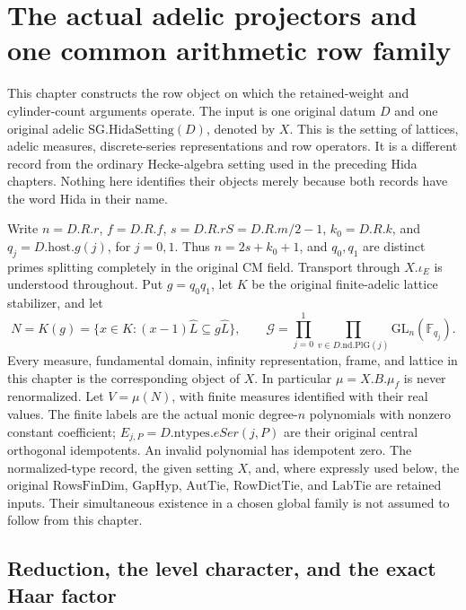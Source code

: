 \documentclass[11pt,a4paper]{article}
\numberwithin{equation}{section}
\theoremstyle{remark}\newtheorem{remark}[theorem]{Remark}
\begin{document}
\section{The actual adelic projectors and one common arithmetic row family}
\label{sec:arithmetic-rows-v46}

This chapter constructs the row object on which the retained-weight
and cylinder-count arguments operate.  The input is one original
datum \(D\) and one original adelic \(\mathrm{SG.HidaSetting}(D)\),
denoted by \(X\).  This is the setting of lattices, adelic measures,
discrete-series representations and row operators.  It is a different
record from the ordinary Hecke-algebra setting used in the preceding
Hida chapters.  Nothing here identifies their objects merely because
both records have the word Hida in their name.

Write \(n=D.R.r\), \(f=D.R.f\), \(s=D.R.rS=D.R.m/2-1\),
\(k_0=D.R.k\), and \(q_j=D.\mathrm{host}.g(j)\), for \(j=0,1\).
Thus \(n=2s+k_0+1\), and \(q_0,q_1\) are distinct primes splitting
completely in the original CM field.  Transport through \(X.\iota_E\)
is understood throughout.  Put \(g=q_0q_1\), let \(K\) be the
original finite-adelic lattice stabilizer, and let
\[
 N=K(g)=\{x\in K:(x-1)\widehat L\subseteq g\widehat L\},
 \qquad
 \mathcal G=\prod_{j=0}^1\prod_{v\in D.\mathrm{nd}.\mathrm{PlG}(j)}
                  \mathrm{GL}_n(\mathbb F_{q_j}).
 \tag{ARO.1}
\]
Every measure, fundamental domain, infinity representation, frame,
and lattice in this chapter is the corresponding object of \(X\).
In particular \(\mu=X.B.\mu_f\) is never renormalized.  Let
\(V=\mu(N)\), with finite measures identified with their real values.
The finite labels are the actual monic degree-\(n\) polynomials with
nonzero constant coefficient; \(E_{j,P}=D.\mathrm{ntypes}.eSer(j,P)\)
are their original central orthogonal idempotents.  An invalid
polynomial has idempotent zero.  The normalized-type record, the
given setting \(X\), and, where expressly used below, the original
\(\mathrm{RowsFinDim}\), \(\mathrm{GapHyp}\), \(\mathrm{AutTie}\),
\(\mathrm{RowDictTie}\), and \(\mathrm{LabTie}\) are retained inputs.
Their simultaneous existence in a chosen global family is not assumed
to follow from this chapter.

\subsection{Reduction, the level character, and the exact Haar factor}

\end{document}
